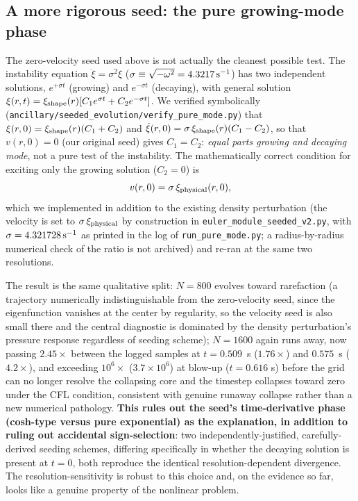 \documentclass[11pt]{article}
\begin{document}
\subsection{A more rigorous seed: the pure growing-mode phase}
\label{sec:pure-mode}

The zero-velocity seed used above is not actually the cleanest possible test. The instability equation $\ddot\xi=\sigma^2\xi$ ($\sigma\equiv\sqrt{-\omega^2}=4.3217\,{\rm s}^{-1}$) has two independent solutions, $e^{+\sigma t}$ (growing) and $e^{-\sigma t}$ (decaying), with general solution $\xi(r,t)=\xi_{\rm shape}(r)[C_1e^{\sigma t}+C_2e^{-\sigma t}]$. We verified symbolically (\texttt{ancillary/seeded\_evolution/verify\_pure\_mode.py}) that $\xi(r,0)=\xi_{\rm shape}(r)(C_1+C_2)$ and $\dot\xi(r,0)=\sigma\,\xi_{\rm shape}(r)(C_1-C_2)$, so that $v(r,0)=0$ (our original seed) gives $C_1=C_2$: \emph{equal parts growing and decaying mode}, not a pure test of the instability. The mathematically correct condition for exciting only the growing solution ($C_2=0$) is
\begin{equation}
v(r,0) = \sigma\,\xi_{\rm physical}(r,0),
\end{equation}
which we implemented in addition to the existing density perturbation (the velocity is set to $\sigma\,\xi_{\rm physical}$ by construction in \texttt{euler\_module\_seeded\_v2.py}, with $\sigma=4.321728\,{\rm s}^{-1}$ as printed in the log of \texttt{run\_pure\_mode.py}; a radius-by-radius numerical check of the ratio is not archived) and re-ran at the same two resolutions.

The result is the same qualitative split: $N=800$ evolves toward rarefaction (a trajectory numerically indistinguishable from the zero-velocity seed, since the eigenfunction vanishes at the center by regularity, so the velocity seed is also small there and the central diagnostic is dominated by the density perturbation's pressure response regardless of seeding scheme); $N=1600$ again runs away, now passing $2.45\times$ between the logged samples at $t=0.509$~s ($1.76\times$) and $0.575$~s ($4.2\times$), and exceeding $10^{6}\times$ ($3.7\times10^{6}$) at blow-up ($t=0.616$ s) before the grid can no longer resolve the collapsing core and the timestep collapses toward zero under the CFL condition, consistent with genuine runaway collapse rather than a new numerical pathology. \textbf{This rules out the seed's time-derivative phase (cosh-type versus pure exponential) as the explanation, in addition to ruling out accidental sign-selection}: two independently-justified, carefully-derived seeding schemes, differing specifically in whether the decaying solution is present at $t=0$, both reproduce the identical resolution-dependent divergence. The resolution-sensitivity is robust to this choice and, on the evidence so far, looks like a genuine property of the nonlinear problem.
\end{document}

